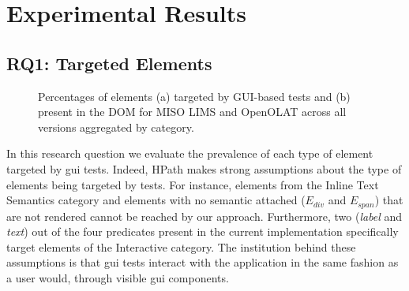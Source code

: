 \section{Experimental Results}

\subsection{RQ1: Targeted Elements}
\label{sec:hpath-results-rq1}

\begin{figure}
\centering
{}
\caption{Percentages of elements (a) targeted by GUI-based tests and (b) present in the DOM for MISO LIMS and OpenOLAT across all versions aggregated by category.}  
\label{fig:hpath-results-frequency}
\end{figure}

In this research question we evaluate the prevalence of each type of element targeted by \gls{gui} tests. Indeed, HPath makes strong assumptions about the type of elements being targeted by tests. For instance, elements from the Inline Text Semantics category and elements with no semantic attached ($E_{div}$ and $E_{span}$) that are not rendered cannot be reached by our approach. Furthermore, two (\emph{label} and \emph{text}) out of the four predicates present in the current implementation specifically target elements of the Interactive category. The institution behind these assumptions is that \gls{gui} tests interact with the application in the same fashion as a user would, through visible \gls{gui} components. 

